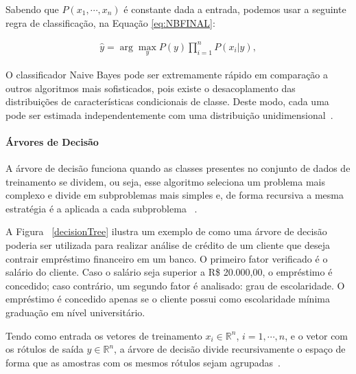         Sabendo que $P(x_{1},\cdots, x_{n})$ é constante dada a entrada, podemos usar a seguinte regra de classificação, na Equação \ref{eq:NBFINAL}:
        
        \begin{equation}\label{eq:NBFINAL}
          \begin{aligned}
            \widehat{y} = \arg\max_{y} P(y)\prod_{i=1}^{n}P(x_{i}|y),
        \end{aligned}
        \end{equation}


        O classificador Naive Bayes pode ser extremamente rápido em comparação a outros algoritmos mais sofisticados, pois existe o desacoplamento
        das distribuições de características condicionais de classe. Deste modo, cada uma pode ser estimada independentemente
         com uma distribuição unidimensional~\cite{zhang2004optimality}.


        \paragraph{Árvores de Decisão}

          A árvore de decisão funciona quando as classes presentes no conjunto de dados de treinamento se dividem, ou seja, esse algoritmo seleciona
          um problema mais complexo e divide em subproblemas mais simples e, de forma recursiva a mesma estratégia é a aplicada a cada subproblema ~\cite{coelhoanalise}.

          A Figura ~\ref{decisionTree} ilustra um exemplo de como uma árvore de decisão poderia ser utilizada para realizar análise de crédito de um cliente que deseja contrair empréstimo financeiro
           em um banco. O primeiro fator verificado é o salário do cliente. Caso o salário seja superior a R\$ 20.000,00, o empréstimo é concedido; 
          caso contrário, um segundo fator é analisado: grau de escolaridade. O empréstimo é concedido apenas se o cliente possui como escolaridade mínima graduação
           em nível universitário.




          Tendo como entrada os vetores de treinamento $x_{i} \in \mathbb{R}^{n}$, $i=1,\cdots, n$, e o vetor com os rótulos de saída $y \in \mathbb{R}^{n}$,
          a árvore de decisão divide recursivamente o espaço de forma que as amostras com os mesmos rótulos sejam agrupadas~\cite{breiman2017classification}.

